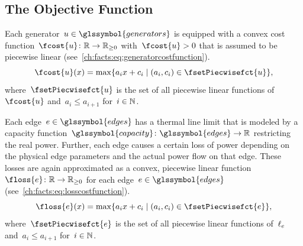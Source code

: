 \subsection{The Objective Function}
\label{ch:facts:sec:model:objective-function}
% 
Each generator~$\vertexa\in\glssymbol{generators}$ is equipped with a convex cost
function~$\fcost{\vertexa}\colon\reals\to\posreals$ with~$\fcost{\vertexa} > 0$
that is assumed to be piecewise linear
(see~\cref{ch:facts:eq:generatorcostfunction}).
% 
\begin{equation}
    \fcost{\vertexa}(x) 
    = 
    \max\{a_i x + c_i \mid(a_i, c_i)\in \fsetPiecwisefct{\vertexa}\},
    \label{ch:facts:eq:generatorcostfunction}
\end{equation}
% 
where~$\fsetPiecwisefct{\vertexa}$ is the set of all piecewise linear functions
of~$\fcost{\vertexa}$ and~$a_i \leq a_{i+1}$ for~$i\in\mathbb{N}$. 

Each edge~$\edge \in \glssymbol{edges}$ has a thermal line limit that is modeled by a
capacity function~$\glssymbol{capacity} \colon \glssymbol{edges} \to \reals$ restricting the real
power. Further, each edge causes a certain loss of power depending on the
physical edge parameters and the actual power flow on that edge. These losses
are again approximated as a convex, piecewise linear
function~$\floss{\edge}\colon\reals\to\posreals$ for each edge~$\edge \in
\glssymbol{edges}$ (see~\cref{ch:facts:eq:losscostfunction}).
% 
\begin{equation}
    \floss{\edge}(x) = \max\{a_i x + c_i \mid(a_i, c_i)\in \fsetPiecwisefct{\edge}\},
    \label{ch:facts:eq:losscostfunction} 
\end{equation}
% 
where~$\fsetPiecwisefct{\edge}$ is the set of all piecewise linear functions
of~$\ell_e$ and~$a_i \leq a_{i+1}$ for~$i\in\mathbb{N}$.


